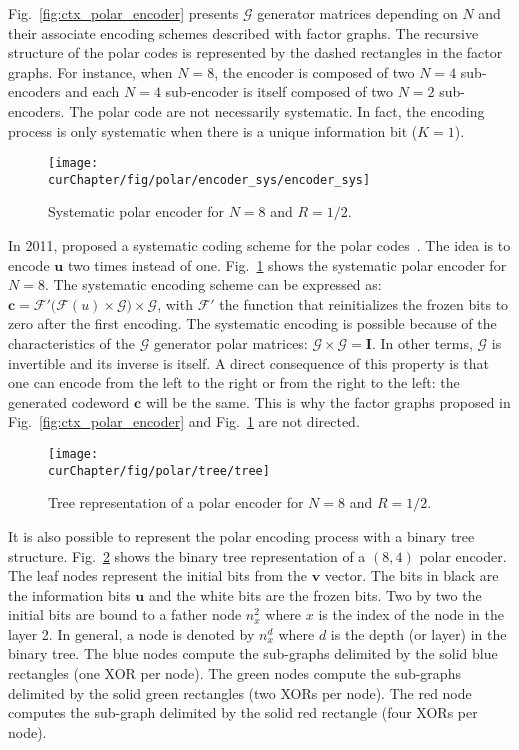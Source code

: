 Fig.~\ref{fig:ctx_polar_encoder} presents $\bm{\mathcal{G}}$ generator
matrices depending on $N$ and their associate encoding schemes described with
factor graphs. The recursive structure of the polar codes is represented by the
dashed rectangles in the factor graphs. For instance, when $N = 8$, the encoder
is composed of two $N = 4$ sub-encoders and each $N = 4$ sub-encoder is itself
composed of two $N = 2$ sub-encoders. The polar code are not necessarily
systematic. In fact, the encoding process is only systematic when there is a
unique information bit ($K =1$).

\begin{figure}[htp]
  \centering
  \texttt{[image: \\curChapter/fig/polar/encoder\_sys/encoder\_sys]}
  \caption{Systematic polar encoder for $N = 8$ and $R = 1/2$.}
  \label{fig:ctx_polar_encoder_sys}
\end{figure}

In 2011, \Arikan proposed a systematic coding scheme for the polar
codes~\cite{Arikan2011}. The idea is to encode $\bm{u}$ two times instead of
one. Fig.~\ref{fig:ctx_polar_encoder_sys} shows the systematic polar
encoder for $N = 8$. The systematic encoding scheme can be expressed as:
$\bm{c} = \mathcal{F'}\big(\mathcal{F}(u) \times \bm{\mathcal{G}}\big) \times
\bm{\mathcal{G}}$, with $\mathcal{F'}$ the function that reinitializes the
frozen bits to zero after the first encoding. The systematic encoding is
possible because of the characteristics of the $\bm{\mathcal{G}}$ generator
polar matrices: $\bm{\mathcal{G}} \times \bm{\mathcal{G}} = \bm{I}$. In other
terms, $\bm{\mathcal{G}}$ is invertible and its inverse is itself. A direct
consequence of this property is that one can encode from the left to the right
or from the right to the left: the generated codeword $\bm{c}$ will be the same.
This is why the factor graphs proposed in Fig.~\ref{fig:ctx_polar_encoder} and
Fig.~\ref{fig:ctx_polar_encoder_sys} are not directed.

\begin{figure}[htp]
  \centering
  \texttt{[image: \\curChapter/fig/polar/tree/tree]}
  \caption{Tree representation of a polar encoder for $N = 8$ and $R = 1/2$.}
  \label{fig:ctx_polar_tree}
\end{figure}

It is also possible to represent the polar encoding process with a binary tree
structure. Fig.~\ref{fig:ctx_polar_tree} shows the binary tree representation of
a $(8,4)$ polar encoder. The leaf nodes represent the initial bits from the
$\bm{v}$ vector. The bits in black are the information bits $\bm{u}$ and the
white bits are the frozen bits. Two by two the initial bits are bound to a
father node $n_x^2$ where $x$ is the index of the node in the layer 2. In
general, a node is denoted by $n_x^d$ where $d$ is the depth (or layer) in the
binary tree. The {\color{Paired-1} blue} nodes compute the sub-graphs delimited
by the solid {\color{Paired-1} blue} rectangles (one XOR per node). The
{\color{Paired-3} green} nodes compute the sub-graphs delimited by the solid
{\color{Paired-3} green} rectangles (two XORs per node). The {\color{Paired-5}
red} node computes the sub-graph delimited by the solid {\color{Paired-5} red}
rectangle (four XORs per node).

